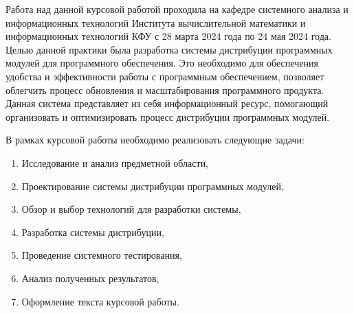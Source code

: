 \Introduction

Работа над данной курсовой работой проходила на кафедре системного анализа и информационных технологий Института вычислительной математики и информационных технологий КФУ с 28 марта 2024 года по 24 мая 2024 года.
Целью данной практики была разработка системы дистрибуции программных модулей для программного обеспечения. Это необходимо для обеспечения удобства и эффективности работы с программным обеспечением, позволяет облегчить процесс обновления и масштабирования программного продукта. Данная система представляет из себя информационный ресурс, помогающий организовать и оптимизировать процесс дистрибуции программных модулей.

В рамках курсовой работы необходимо реализовать следующие задачи:

\renewcommand{\labelenumi}{\arabic{enumi})}
\renewcommand{\labelenumii}{\asbuk{enumii})}

\begin{enumerate}
\item Исследование и анализ предметной области,
\item Проектирование системы дистрибуции программных модулей,
\item Обзор и выбор технологий для разработки системы,
\item Разработка системы дистрибуции,
\item Проведение системного тестирования,
\item Анализ полученных результатов,
\item Оформление текста курсовой работы.
\end{enumerate}
